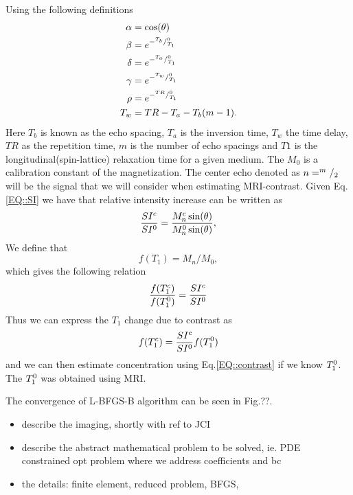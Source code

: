 \documentclass[11pt,a4paper]{article}
\begin{document}
Using the following definitions
\begin{equation}
\begin{aligned}
\alpha &= \cos ( \theta ) \\
\beta  &= e\sp{- \sp{T_b}/_{T_1}\sp{0} } \\
\delta &= e\sp{- \sp{T_a}/_{T_1}\sp{0} } \\
\gamma &= e\sp{- \sp{T_w}/_{T_1}\sp{0} } \\
\rho   &= e\sp{- \sp{TR}/_{T_1}\sp{0} }  \\
T_w    &= TR - T_a -T_b(m-1)       .\\
\end{aligned}
\end{equation}
Here $T_b$ is known as the echo spacing, $T_a$ is the inversion time, $T_w$ the time delay, $TR$ as the repetition time, $m$ is the number of echo spacings and $T1$ is the longitudinal(spin-lattice) relaxation time for a given medium. The $M_0$ is a calibration constant of the magnetization. The center echo denoted as $n=\sp{m}/_2$ will be the signal that we will consider when estimating MRI-contrast. Given Eq.\ref{EQ::SI} we have that relative intensity increase can be written as 
\begin{equation}
\frac{SI\sp{c}}{SI\sp{0}} = \frac{ M_{n}\sp{c} \sin (\theta)}{ M_{n}\sp{0} \sin (\theta) } ,
\end{equation}
We define that  
\begin{equation}
f(T_1) = M_{n}/M_{0} ,
\label{FIG::F}
\end{equation}
which gives the following relation 
\begin{equation}
\frac{f(T_{1}\sp{c} ) }{f(T_{1}\sp{0})}  = \frac{SI\sp{c}}{SI\sp{0}} 
\end{equation}
Thus we can express the $T_1$ change due to contrast as 
\begin{equation}
f ( T_{1}\sp{c} ) = \frac{SI\sp{c}}{SI\sp{0}} f(T_{1}\sp{0}) 
\end{equation}
and we can then estimate concentration using Eq.\ref{EQ::contrast} if we know $T_{1}\sp{0}$. The $T_{1}\sp{0}$ was obtained using MRI.


 


The convergence of L-BFGS-B algorithm can be seen in Fig.??. 
\begin{itemize}
\item describe the imaging, shortly with ref to JCI  
\item describe the abstract mathematical problem to be solved, ie. PDE constrained opt problem where we 
address coefficients and bc  
\item the details: finite element, reduced problem, BFGS,  
\end{itemize}
\end{document}
